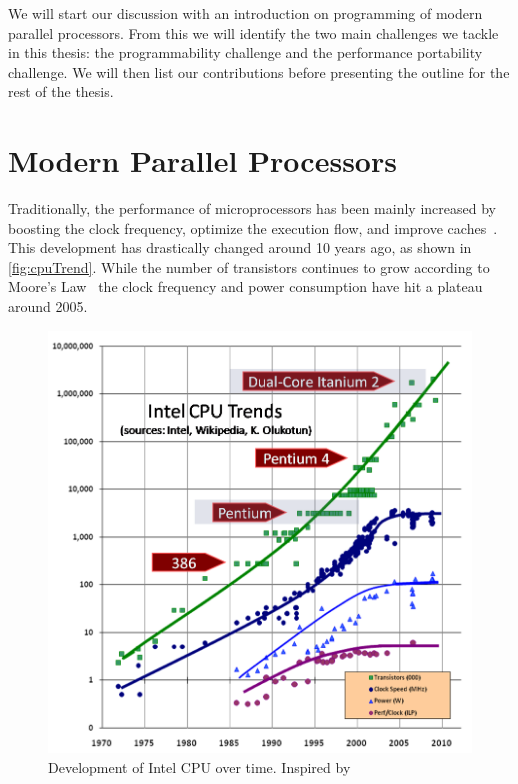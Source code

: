 \noindent
We will start our discussion with an introduction on programming of modern parallel processors.
From this we will identify the two main challenges we tackle in this thesis:
the programmability challenge and the performance portability challenge.
We will then list our contributions before presenting the outline for the rest of the thesis.

\section{Modern Parallel Processors}

Traditionally, the performance of microprocessors has been mainly increased by boosting the clock frequency, optimize the execution flow, and improve caches~\cite{Sutter2005}.
This development has drastically changed around 10 years ago, as shown in \autoref{fig:cpuTrend}.
While the number of transistors continues to grow according to Moore's Law~\cite{Moore1998} the clock frequency and power consumption have hit a plateau around 2005.
\begin{figure}
  \centering
  \includegraphics[width=.9\linewidth]{Figures/CPU.png}
  \caption{Development of Intel CPU over time. Inspired by~\cite{Sutter2005}}
  \label{fig:cpuTrend}
\end{figure} 
